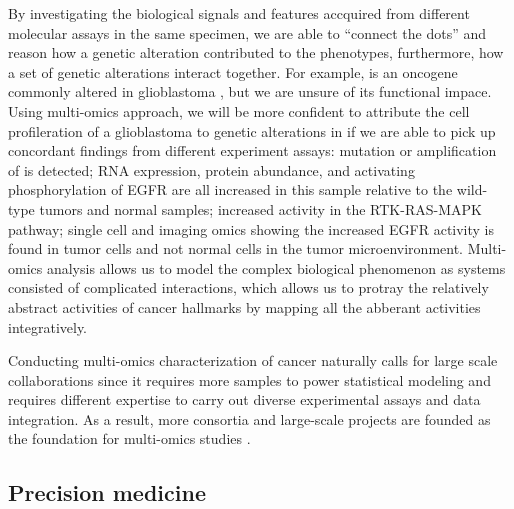 By investigating the biological signals and features accquired from different molecular assays in the same specimen, we are able to ``connect the dots'' and reason how a genetic alteration contributed to the phenotypes, furthermore, how a set of genetic alterations interact together. For example,  is an oncogene commonly altered in glioblastoma \cite{eskilssone_miletich:EGFRHeterogeneity2018}, but we are unsure of its functional impace. Using multi-omics approach, we will be more confident to attribute the cell profileration of a glioblastoma to genetic alterations in  if we are able to pick up concordant findings from different experiment assays: mutation or amplification of  is detected; RNA expression, protein abundance, and activating phosphorylation of EGFR are all increased in this sample relative to the wild-type tumors and normal samples; increased activity in the RTK-RAS-MAPK pathway; single cell and imaging omics showing the increased EGFR activity is found in tumor cells and not normal cells in the tumor microenvironment. Multi-omics analysis allows us to model the complex biological phenomenon as systems consisted of complicated interactions, which allows us to protray the relatively abstract activities of cancer hallmarks by mapping all the abberant activities integratively.

Conducting multi-omics characterization of cancer naturally calls for large scale collaborations since it requires more samples to power statistical modeling and requires different expertise to carry out diverse experimental assays and data integration. As a result, more consortia and large-scale projects are founded as the foundation for multi-omics studies \cite{hutterc_zenklusenjc:CancerGenome2018,rozenblatt-roseno_zhuangx:HumanTumor2020,rodriguezh_lowydr:NextHorizon2021}.


\subsection{Precision medicine}




